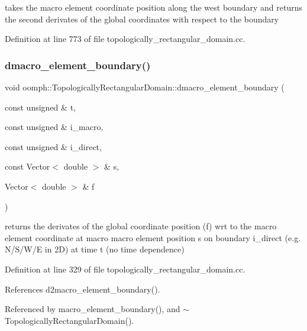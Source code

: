 takes the macro element coordinate position along the west boundary and returns the second derivates of the global coordinates with respect to the boundary 



Definition at line 773 of file topologically\+\_\+rectangular\+\_\+domain.\+cc.

\mbox{\label{classoomph_1_1TopologicallyRectangularDomain_a218b22a016e2f330d6b90354597d9786}} 
\subsubsection{\texorpdfstring{dmacro\+\_\+element\+\_\+boundary()}{dmacro\_element\_boundary()}}
{\footnotesize\ttfamily void oomph\+::\+Topologically\+Rectangular\+Domain\+::dmacro\+\_\+element\+\_\+boundary (\begin{DoxyParamCaption}\item[{const unsigned \&}]{t,  }\item[{const unsigned \&}]{i\+\_\+macro,  }\item[{const unsigned \&}]{i\+\_\+direct,  }\item[{const Vector$<$ double $>$ \&}]{s,  }\item[{Vector$<$ double $>$ \&}]{f }\end{DoxyParamCaption})}

returns the derivates of the global coordinate position (f) wrt to the macro element coordinate at macro macro element position s on boundary i\+\_\+direct (e.\+g. N/\+S/\+W/E in 2D) at time t (no time dependence) 

Definition at line 329 of file topologically\+\_\+rectangular\+\_\+domain.\+cc.



References d2macro\+\_\+element\+\_\+boundary().



Referenced by macro\+\_\+element\+\_\+boundary(), and $\sim$\+Topologically\+Rectangular\+Domain().

\mbox{\label{classoomph_1_1TopologicallyRectangularDomain_a22b9364ef22563bea32aad2ff9e6851f}} 
